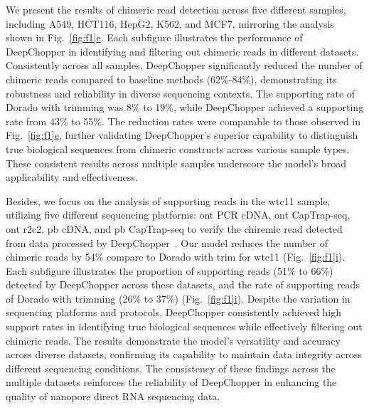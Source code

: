 \documentclass[pdflatex, sn-mathphys-num, lineno]{sn-jnl}%
\newcommand{\figref}[2]{Fig.~\hyperref[#1]{\ref*{#1}#2}}
\theoremstyle{thmstyleone}%
\theoremstyle{thmstyletwo}%
\theoremstyle{thmstylethree}%
\begin{document}
We present the results of chimeric read detection across five different samples, including A549, HCT116, HepG2, K562, and MCF7, mirroring the analysis shown in \figref{fig:f1}{e}.
Each subfigure  illustrates the performance of DeepChopper in identifying and filtering out chimeric reads in different datasets.
Consistently across all samples, DeepChopper significantly reduced the number of chimeric reads compared to baseline methods (62\%-84\%), demonstrating its robustness and reliability in diverse sequencing contexts.
The supporting rate of Dorado with trimming was 8\% to 19\%, while DeepChopper achieved a supporting rate from 43\% to 55\%.
The reduction rates were comparable to those observed in \figref{fig:f1}{e}, further validating DeepChopper’s superior capability to distinguish true biological sequences from chimeric constructs across various sample types.
These consistent results across multiple samples underscore the model's broad applicability and effectiveness.

Besides, we focus on the analysis of supporting reads in the wtc11 sample, utilizing five different sequencing platforms: \gls{ont} PCR cDNA, \gls{ont} CapTrap-seq, \gls{ont} \gls{r2c2}, \gls{pb} cDNA, and \gls{pb} CapTrap-seq to verify the chiremic read detected from data processed by DeepChopper~\cite{carbonell2024captrap}.
Our model reduces the number of chimeric reads by 54\% compare to Dorado with trim for wtc11  (\figref{fig:f1}{i}).
Each subfigure illustrates the proportion of supporting reads (51\% to 66\%) detected by DeepChopper across these datasets, and the rate of supporting reads of Dorado with trimming (26\% to 37\%)  (\figref{fig:f1}{i}).
Despite the variation in sequencing platforms and protocols, DeepChopper consistently achieved high support rates in identifying true biological sequences while effectively filtering out chimeric reads.
The results demonstrate the model's versatility and accuracy across diverse datasets, confirming its capability to maintain data integrity across different sequencing conditions.
The consistency of these findings across the multiple datasets reinforces the reliability of DeepChopper in enhancing the quality of nanopore direct RNA sequencing data.
\end{document}
